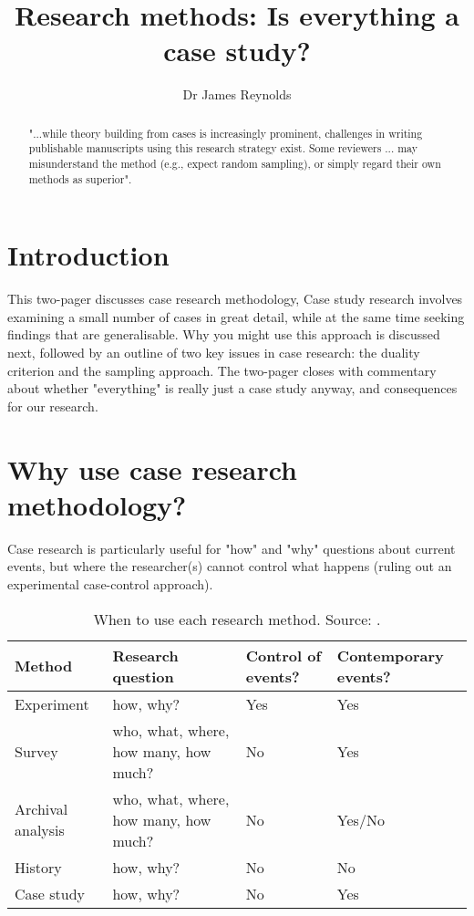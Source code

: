 \documentclass{tufte-handout}
\title{Research methods: Is everything a case study?}
\author{Dr James Reynolds}
\begin{document}
\maketitle%

\begin{abstract}
\noindent
"...while theory building from cases is increasingly prominent, challenges in writing publishable manuscripts using this research strategy exist.  Some reviewers ... may misunderstand the method (e.g., expect random sampling), or simply regard their own methods as superior"\cite{Eisenhardt2007TBfC}.
\end{abstract}


\section{Introduction}
This two-pager 
discusses case research methodology, 
Case study research involves 
examining a small number of cases 
in great detail, 
while at the same time 
seeking findings that are generalisable\cite{Yin2009aa, Barrat2011aa, Ketokivi2014aa,}. 
Why you might use this approach 
 is discussed next, 
 followed by 
an outline of 
 two key issues in case research: 
 the duality criterion 
 and the sampling approach. 
 The two-pager closes with 
 commentary about 
 whether "everything" is really just a case study anyway, 
 and consequences for our research.

\section{Why use case research methodology?} 
Case research is particularly useful for "how" and "why" questions 
about current events, 
but where the researcher(s) cannot 
control what happens (ruling out an experimental case-control approach). 

\begin{table*}[ht]
  \centering
  \selectfont
  \begin{tabular}{llll}
    \toprule
    Method & Research question & Control of events? & Contemporary events? \\
    \midrule
    Experiment & how, why? & Yes & Yes \\
    Survey & who, what, where, how many, how much? & No & Yes \\
    Archival analysis & who, what, where, how many, how much? & No & Yes/No \\
    History & how, why? & No & No \\
    Case study & how, why? & No & Yes \\
    \bottomrule
  \end{tabular}
  \caption{When to use each research method. Source: \citet{Yin2009aa}.}
  \label{tab:when_where}
\end{table*}
\end{document}
